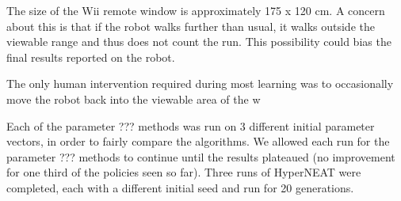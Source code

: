 The size of the Wii remote window is approximately 175 x 120 cm. A
concern about this is that if the robot walks further than usual,
it walks outside the viewable range and thus does not count the run.
This possibility could bias the final results reported on the robot.

The only human intervention required during most learning was to
occasionally move the robot back into the viewable area of the w


Each of the parameter ??? methods was run on 3 different initial
parameter vectors, in order to fairly compare the algorithms. We allowed 
each run for the parameter ??? methods to
continue until the results plateaued (no improvement for one third of
the policies seen so far). Three runs of HyperNEAT were completed,
each with a different initial seed and run for 20 generations.
